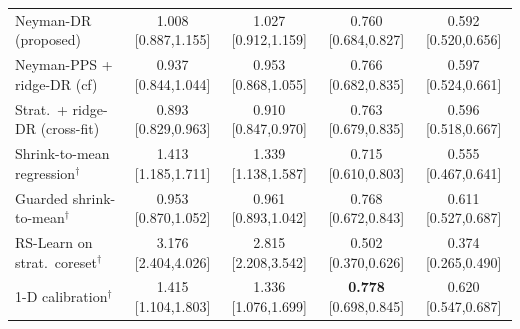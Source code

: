 \begin{tabular}{l cccc}
Neyman-DR (proposed) & 1.008 {\scriptsize[0.887,1.155]} & 1.027 {\scriptsize[0.912,1.159]} & 0.760 {\scriptsize[0.684,0.827]} & 0.592 {\scriptsize[0.520,0.656]} \\
Neyman-PPS + ridge-DR (cf) & 0.937 {\scriptsize[0.844,1.044]} & 0.953 {\scriptsize[0.868,1.055]} & 0.766 {\scriptsize[0.682,0.835]} & 0.597 {\scriptsize[0.524,0.661]} \\
Strat.\ + ridge-DR (cross-fit) & 0.893 {\scriptsize[0.829,0.963]} & 0.910 {\scriptsize[0.847,0.970]} & 0.763 {\scriptsize[0.679,0.835]} & 0.596 {\scriptsize[0.518,0.667]} \\
Shrink-to-mean regression$^\dagger$ & 1.413 {\scriptsize[1.185,1.711]} & 1.339 {\scriptsize[1.138,1.587]} & 0.715 {\scriptsize[0.610,0.803]} & 0.555 {\scriptsize[0.467,0.641]} \\
Guarded shrink-to-mean$^\dagger$ & 0.953 {\scriptsize[0.870,1.052]} & 0.961 {\scriptsize[0.893,1.042]} & 0.768 {\scriptsize[0.672,0.843]} & 0.611 {\scriptsize[0.527,0.687]} \\
RS-Learn on strat.\ coreset$^\dagger$ & 3.176 {\scriptsize[2.404,4.026]} & 2.815 {\scriptsize[2.208,3.542]} & 0.502 {\scriptsize[0.370,0.626]} & 0.374 {\scriptsize[0.265,0.490]} \\
1-D calibration$^\dagger$ & 1.415 {\scriptsize[1.104,1.803]} & 1.336 {\scriptsize[1.076,1.699]} & \textbf{0.778} {\scriptsize[0.698,0.845]} & 0.620 {\scriptsize[0.547,0.687]} \\
\bottomrule
\end{tabular}
